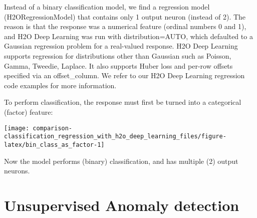 \documentclass[]{book}
\newenvironment{Shaded}{\begin{snugshade}}{\end{snugshade}}
\newcommand{\CommentTok}[1]{\textcolor[rgb]{0.56,0.35,0.01}{\textit{#1}}}
\newcommand{\DataTypeTok}[1]{\textcolor[rgb]{0.13,0.29,0.53}{#1}}
\newcommand{\DecValTok}[1]{\textcolor[rgb]{0.00,0.00,0.81}{#1}}
\newcommand{\FloatTok}[1]{\textcolor[rgb]{0.00,0.00,0.81}{#1}}
\newcommand{\KeywordTok}[1]{\textcolor[rgb]{0.13,0.29,0.53}{\textbf{#1}}}
\newcommand{\NormalTok}[1]{#1}
\newcommand{\OperatorTok}[1]{\textcolor[rgb]{0.81,0.36,0.00}{\textbf{#1}}}
\newcommand{\StringTok}[1]{\textcolor[rgb]{0.31,0.60,0.02}{#1}}
\begin{document}
Instead of a binary classification model, we find a regression model (H2ORegressionModel) that contains only 1 output neuron (instead of 2). The reason is that the response was a numerical feature (ordinal numbers 0 and 1), and H2O Deep Learning was run with distribution=AUTO, which defaulted to a Gaussian regression problem for a real-valued response. H2O Deep Learning supports regression for distributions other than Gaussian such as Poisson, Gamma, Tweedie, Laplace. It also supports Huber loss and per-row offsets specified via an offset\_column. We refer to our H2O Deep Learning regression code examples for more information.

To perform classification, the response must first be turned into a categorical (factor) feature:

\begin{Shaded}
\end{Shaded}

\begin{center}\texttt{[image: comparison-classification\_regression\_with\_h2o\_deep\_learning\_files/figure-latex/bin\_class\_as\_factor-1]} \end{center}

Now the model performs (binary) classification, and has multiple (2) output neurons.

\hypertarget{unsupervised-anomaly-detection}{%
\section{Unsupervised Anomaly detection}\label{unsupervised-anomaly-detection}}
\end{document}
